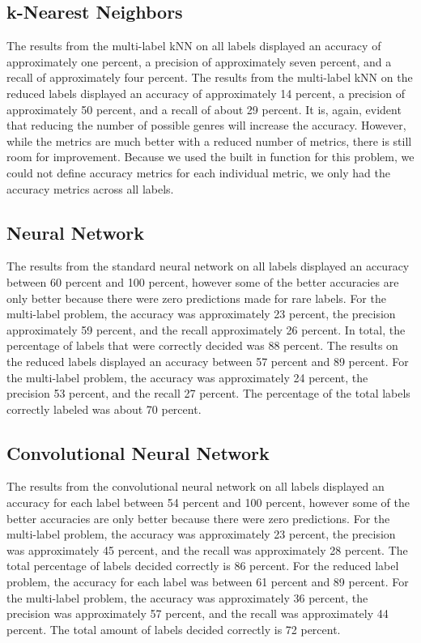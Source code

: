 \documentclass[sigconf]{acmart}
\begin{document}
\subsection{k-Nearest Neighbors}
The results from the multi-label kNN on all labels displayed an accuracy of approximately one percent, a precision of approximately seven percent, and a recall of approximately four percent. The results from the multi-label kNN on the reduced labels displayed an accuracy of approximately 14 percent, a precision of approximately 50 percent, and a recall of about 29 percent. It is, again, evident that reducing the number of possible genres will increase the accuracy. However, while the metrics are much better with a reduced number of metrics, there is still room for improvement. Because we used the built in function for this problem, we could not define accuracy metrics for each individual metric, we only had the accuracy metrics across all labels.

\subsection{Neural Network}
The results from the standard neural network on all labels displayed an accuracy between 60 percent and 100 percent, however some of the better accuracies are only better because there were zero predictions made for rare labels. For the multi-label problem, the accuracy was approximately 23 percent, the precision approximately 59 percent, and the recall approximately 26 percent. In total, the percentage of labels that were correctly decided was 88 percent. The results on the reduced labels displayed an accuracy between 57 percent and 89 percent. For the multi-label problem, the accuracy was approximately 24 percent, the precision 53 percent, and the recall 27 percent. The percentage of the total labels correctly labeled was about 70 percent.

\subsection{Convolutional Neural Network}
The results from the convolutional neural network on all labels displayed an accuracy for each label between 54 percent and 100 percent, however some of the better accuracies are only better because there were zero predictions. For the multi-label problem, the accuracy was approximately 23 percent, the precision was approximately 45 percent, and the recall was approximately 28 percent. The total percentage of labels decided correctly is 86 percent. For the reduced label problem, the accuracy for each label was between 61 percent and 89 percent. For the multi-label problem, the accuracy was approximately 36 percent, the precision was approximately 57 percent, and the recall was approximately 44 percent. The total amount of labels decided correctly is 72 percent.
\end{document}
